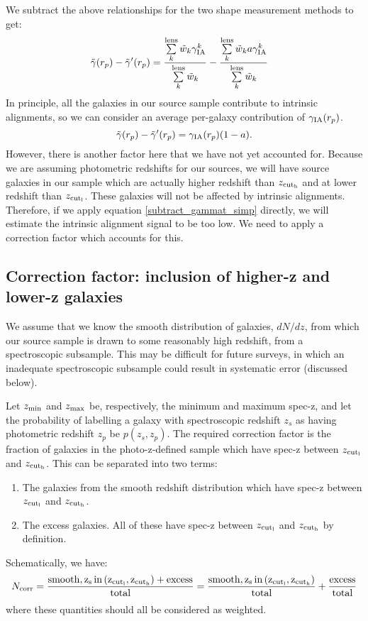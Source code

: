 \documentclass[onecolumn,amsmath,aps,fleqn, superscriptaddress]{revtex4}
\begin{document}
We subtract the above relationships for the two shape measurement methods to get:
\begin{align}
\tilde{\gamma}(r_p) - \tilde{\gamma}^\prime(r_p) &= \frac{\sum\limits_{k}^{\rm lens} \tilde{w}_k \gamma_{\rm IA}^k}{\sum\limits_{k}^{\rm lens} \tilde{w}_k} - \frac{\sum\limits_{k}^{\rm lens} \tilde{w}_k a \gamma_{\rm IA}^k}{\sum\limits_{k}^{\rm lens} \tilde{w}_k} 
\label{subtract_gammat}
\end{align}
In principle, all the galaxies in our source sample contribute to intrinsic alignments, so we can consider an average per-galaxy contribution of $\gamma_{\rm IA}(r_p)$.
\begin{equation}
\tilde{\gamma}(r_p) - \tilde{\gamma}^\prime(r_p) = \gamma_{\rm IA}(r_p)(1-a).
\label{subtract_gammat_simp}
\end{equation}
However, there is another factor here that we have not yet accounted for. Because we are assuming photometric redshifts for our sources, we will have source galaxies in our sample which are actually higher redshift than $z_{\rm cut_h}$ and at lower redshift than $z_{\rm cut_l}$. These galaxies will not be affected by intrinsic alignments. Therefore, if we apply equation \ref{subtract_gammat_simp} directly, we will estimate the intrinsic alignment signal to be too low. We need to apply a correction factor which accounts for this. 

\subsection*{Correction factor: inclusion of higher-z and lower-z galaxies}
We assume that we know the smooth distribution of galaxies, $dN / dz$, from which our source sample is drawn to some reasonably high redshift, from a spectroscopic subsample. This may be difficult for future surveys, in which an inadequate spectroscopic subsample could result in systematic error (discussed below). 

Let $z_{\rm min}$ and $z_{\rm max}$ be, respectively, the minimum and maximum spec-z, and let the probability of labelling a galaxy with spectroscopic redshift $z_s$ as having photometric redshift $z_p$ be $p(z_s, z_p)$. The required correction factor is the fraction of galaxies in the photo-z-defined sample which have spec-z between $z_{\rm cut_l}$ and $z_{\rm cut_h}$. This can be separated into two terms:
\begin{enumerate}
\item{The galaxies from the smooth redshift distribution which have spec-z between $z_{\rm cut_l}$ and $z_{\rm cut_h}$.}
\item{The excess galaxies. All of these have spec-z between $z_{\rm cut_l}$ and $z_{\rm cut_h}$ by definition.}
\end{enumerate}
Schematically, we have:
\begin{equation}
N_{\rm corr} = \frac{{\rm smooth, z_s \, in \, (z_{\rm cut_l}, z_{\rm cut_h})} + {\rm excess}}{{\rm total}} =  \frac{{\rm smooth, z_s \, in \, (z_{\rm cut_l}, z_{\rm cut_h})}}{{\rm total}} + \frac{{\rm excess}}{{\rm total}}
\label{schematic}
\end{equation}
where these quantities should all be considered as weighted. 
\end{document}
